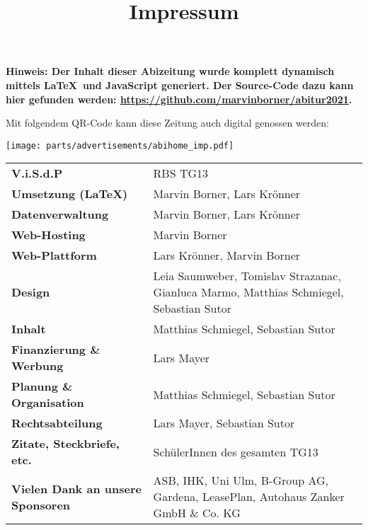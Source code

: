 \title{Impressum}


\textbf{Hinweis: Der Inhalt dieser Abizeitung wurde komplett dynamisch mittels \LaTeX\  und JavaScript generiert. Der Source-Code dazu kann hier gefunden werden: \url{https://github.com/marvinborner/abitur2021}.}

Mit folgendem QR-Code kann diese Zeitung auch digital genossen werden:

\begin{center}
\end{center}

\texttt{[image: parts/advertisements/abihome\_imp.pdf]}

\begin{table}[b]
	\begin{tabular}{ l l }
		\textbf{V.i.S.d.P}                 & RBS TG13                                                                                \\ %
		\textbf{Umsetzung (\LaTeX)}        & Marvin Borner, Lars Krönner                                                             \\
		\textbf{Datenverwaltung}           & Marvin Borner, Lars Krönner                                                             \\
		\textbf{Web-Hosting}               & Marvin Borner                                                                           \\
		\textbf{Web-Plattform}             & Lars Krönner, Marvin Borner                                                             \\
		\textbf{Design}                    & Leia Saumweber, Tomislav Strazanac, Gianluca Marmo, Matthias Schmiegel, Sebastian Sutor \\
		\textbf{Inhalt}                    & Matthias Schmiegel, Sebastian Sutor                                                     \\
		\textbf{Finanzierung \& Werbung}   & Lars Mayer                                                                              \\
		\textbf{Planung \& Organisation}   & Matthias Schmiegel, Sebastian Sutor                                                     \\
		\textbf{Rechtsabteilung}           & Lars Mayer, Sebastian Sutor                                                             \\
		\textbf{Zitate, Steckbriefe, etc.} & SchülerInnen des gesamten TG13 														 \\
		\textbf{Vielen Dank an unsere Sponsoren} & ASB, IHK, Uni Ulm, B-Group AG, Gardena, LeasePlan, Autohaus Zanker GmbH \& Co. KG 
	\end{tabular}
\end{table}
